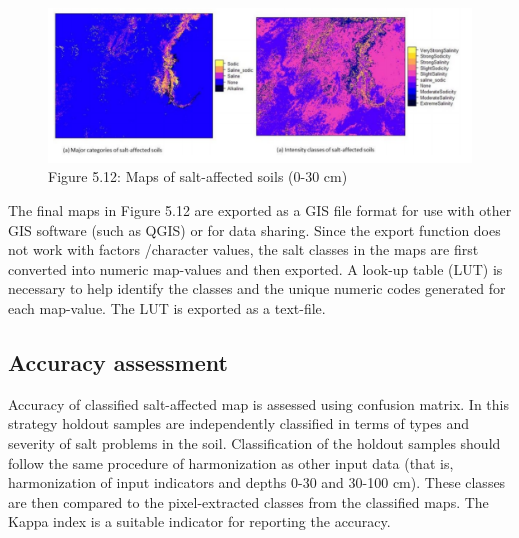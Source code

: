 \documentclass[
  10pt,
  b5paper,
]{book}
\newenvironment{Shaded}{\begin{snugshade}}{\end{snugshade}}
\newcommand{\CommentTok}[1]{\textcolor[rgb]{0.56,0.35,0.01}{\textit{#1}}}
\newcommand{\DataTypeTok}[1]{\textcolor[rgb]{0.13,0.29,0.53}{#1}}
\newcommand{\KeywordTok}[1]{\textcolor[rgb]{0.13,0.29,0.53}{\textbf{#1}}}
\newcommand{\NormalTok}[1]{#1}
\newcommand{\OperatorTok}[1]{\textcolor[rgb]{0.81,0.36,0.00}{\textbf{#1}}}
\newcommand{\OtherTok}[1]{\textcolor[rgb]{0.56,0.35,0.01}{#1}}
\newcommand{\StringTok}[1]{\textcolor[rgb]{0.31,0.60,0.02}{#1}}
\begin{document}
\begin{figure}
\centering
\includegraphics{figures/images/Figure5.12.PNG}
\caption{Figure 5.12: Maps of salt-affected soils (0-30 cm)}
\end{figure}

The final maps in Figure 5.12 are exported as a GIS file format for use with other GIS software (such as QGIS) or for data sharing. Since the export function does not work with factors /character values, the salt classes in the maps are first converted into numeric map-values and then exported. A look-up table (LUT) is necessary to help identify the classes and the unique numeric codes generated for each map-value. The LUT is exported as a text-file.

\begin{Shaded}
\end{Shaded}

\hypertarget{accuracy-assessment}{%
\subsection{Accuracy assessment}\label{accuracy-assessment}}

Accuracy of classified salt-affected map is assessed using confusion matrix. In this strategy holdout samples are independently classified in terms of types and severity of salt problems in the soil. Classification of the holdout samples should follow the same procedure of harmonization as other input data (that is, harmonization of input indicators and depths 0-30 and 30-100 cm). These classes are then compared to the pixel-extracted classes from the classified maps. The Kappa index is a suitable indicator for reporting the accuracy.
\end{document}
